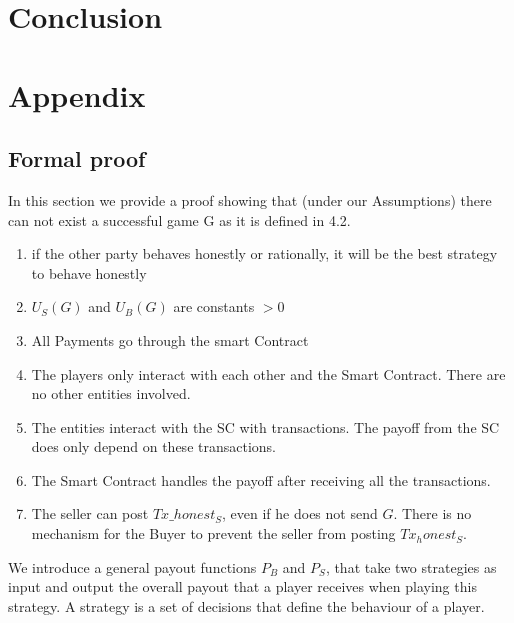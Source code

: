 \documentclass{cacthesis}
\begin{document}
\chapter{Conclusion}

\chapter{Appendix}

\section{Formal proof}
In this section we provide a proof showing that (under our Assumptions) there can not exist  a successful game G as it is defined in 4.2.

\begin{enumerate}
    \item if the other party behaves honestly or rationally, it will be the best strategy to behave honestly
    \item $U_S(G)$ and $U_B(G)$ are constants $> 0$
    \item All Payments go through the smart Contract
    \item The players only interact with each other and the Smart Contract. There are no other entities involved.
    \item The entities interact with the SC with transactions. The payoff from the SC does only depend on these transactions.
    \item The Smart Contract handles the payoff after receiving all the transactions.
    \item The seller can post $Tx\_honest_S$, even if he does not send $G$. There is no mechanism for the Buyer to prevent the seller from posting $Tx_honest_S$.

\end{enumerate}


We introduce a general payout functions $P_B$ and $P_S$, that take two strategies as input and output the overall payout that a player receives when playing this strategy.\newline
A strategy is a set of decisions that define the behaviour of a player. %
\end{document}

